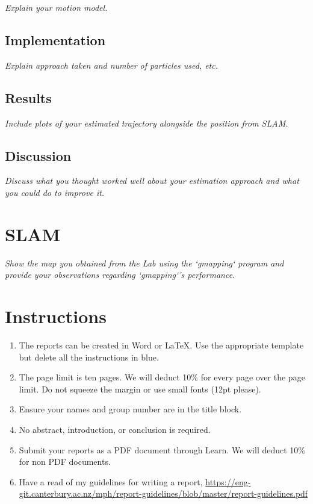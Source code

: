 \documentclass[a4paper,12pt]{article}
\newcommand{\comment}[1]{\emph{\color{blue}#1}}
\begin{document}
\comment{Explain your motion model.}


\subsection{Implementation}

\comment{Explain approach taken and number of particles used, etc.}


\subsection{Results}

\comment{Include plots of your estimated trajectory alongside the
  position from SLAM.}


\subsection{Discussion}

\comment{Discuss what you thought worked well about your estimation
  approach and what you could do to improve it.}


\section{SLAM}

\comment{Show the map you obtained from the Lab using the `gmapping`
  program and provide your observations regarding `gmapping`'s
  performance.}

\color{blue}
\section*{Instructions}

\begin{enumerate}
\item The reports can be created in Word or \LaTeX.  Use the
  appropriate template but delete all the instructions in blue.

\item The page limit is ten pages.  We will deduct 10\% for every page
  over the page limit.  Do not squeeze the margin or use small fonts
  (12pt please).

\item Ensure your names and group number are in the title block.

\item No abstract, introduction, or conclusion is required.

\item Submit your reports as a PDF document through Learn.  We will
  deduct 10\% for non PDF documents.

\item Have a read of my guidelines for writing a report,
  \url{https://eng-git.canterbury.ac.nz/mph/report-guidelines/blob/master/report-guidelines.pdf}

\end{enumerate}
\end{document}
